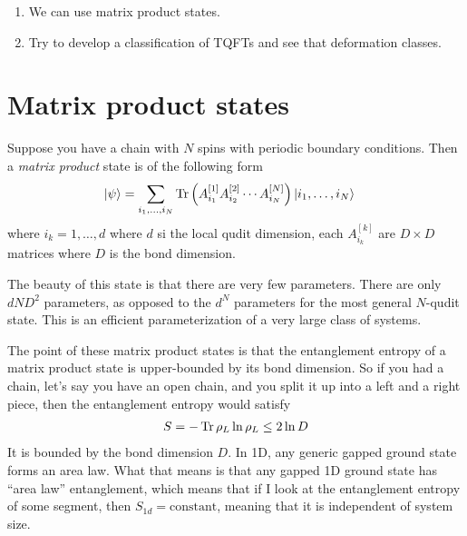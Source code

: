 \begin{enumerate}
    \item We can use matrix product states.
    \item Try to develop a classification of TQFTs and see that deformation
        classes.
\end{enumerate}

\section{Matrix product states}
Suppose you have a chain with $N$ spins with periodic boundary conditions.
Then a \emph{matrix product} state is of the following form
\begin{align}
    \ket{\psi} &=
    \sum_{i_1,\ldots,i_N} 
    \Tr\left( 
    A_{i_1}^{[1]}
    A_{i_2}^{[2]}
    \cdots
    A_{i_N}^{[N]}
    \right)
    \ket{i_1,\ldots,i_N}
\end{align}
where $i_k=1,\ldots,d$ where $d$ si the local qudit dimension,
each $A_{i_k}^{[k]}$ are $D\times D$ matrices
where $D$ is the bond dimension.

The beauty of this state is that there are very few parameters.
There are only $dND^2$ parameters,
as opposed to the $d^N$ parameters for the most general $N$-qudit state.
This is an efficient parameterization of a very large class of systems.

The point of these matrix product states is that the entanglement entropy of a
matrix product state is upper-bounded by its bond dimension.
So if you had a chain,
let's say you have an open chain,
and you split it up into a left and a right piece,
then the entanglement entropy would satisfy
\begin{align}
    S = -\Tr \rho_L \ln \rho_L \le 2 \ln D
\end{align}
It is bounded by the bond dimension $D$.
In 1D,
any generic gapped ground state forms an area law.
What that means is that any gapped 1D ground state has ``area law''
entanglement,
which means that if I look at the entanglement entropy of some segment,
then $S_{1d}=\mathrm{constant}$,
meaning that it is independent of system size.

